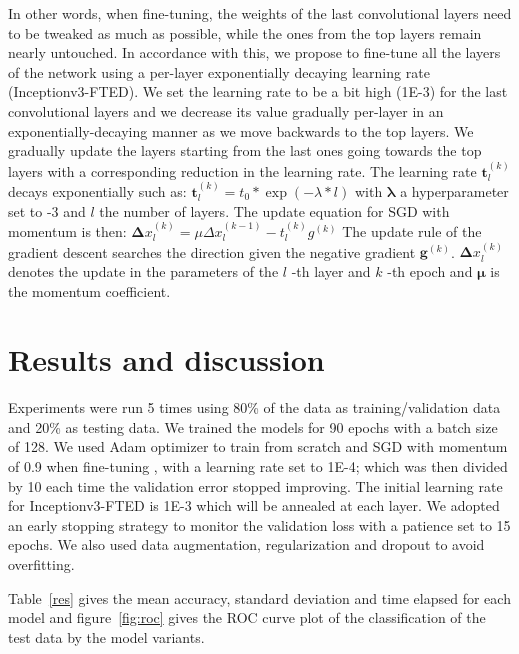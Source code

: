 \documentclass{article}
\begin{document}
In other words, when fine-tuning, the weights of the last convolutional layers need to be tweaked as much as possible, while the ones from the top layers remain nearly untouched.
In accordance with this, we propose to fine-tune all the layers of the network using a per-layer exponentially decaying learning rate  \citep{walter1990nonlinear} (Inceptionv3-FTED).
We set the learning rate to be a bit high (1E-3) for the last convolutional layers and we decrease its value gradually per-layer in an exponentially-decaying manner as we move backwards to the top layers.
We gradually update the layers starting from the last ones going towards the top layers with a corresponding reduction in the learning rate.
The learning rate $\mathbf t_{l}^{(k)} $ decays exponentially such as:
$\mathbf t_{l}^{(k)}= t_{0} \ast \exp (-\lambda \ast l)$ with $\mathbf \lambda $ a hyperparameter set to -3 and $\mathit{l}$ the number of layers. The update equation for SGD with momentum is then: $\mathbf \Delta x_{l}^{(k)}= \mu \Delta x_{l}^{(k-1)}-t_{l}^{(k)} g^{(k)} $
The update rule of the gradient descent searches the direction given the negative gradient $\mathbf g^{(k)} $. $\mathbf \Delta x_{l}^{(k)} $ denotes the update in the parameters of the $\mathit{l}$ -th layer and $\mathit{k}$ -th epoch and $\mathbf \mu $ is the momentum coefficient.

\section{Results and discussion}

Experiments were run 5 times using 80\% of the data as training/validation data and 20\% as testing data. We trained the models for 90 epochs with a batch size of 128. We used Adam optimizer to train from scratch and SGD with momentum of 0.9 when fine-tuning , with a learning rate set to 1E-4; which was then divided by 10 each time the validation error stopped improving. The initial learning rate for Inceptionv3-FTED is 1E-3 which will be annealed at each layer. We adopted an early stopping strategy to monitor the validation loss with a patience set to 15 epochs. We also used data augmentation, regularization and dropout to avoid overfitting.

Table~\ref{res} gives the mean accuracy, standard deviation and time elapsed for each model and figure~\ref{fig:roc} gives the ROC curve plot of the classification of the test data by the model variants.
\end{document}

